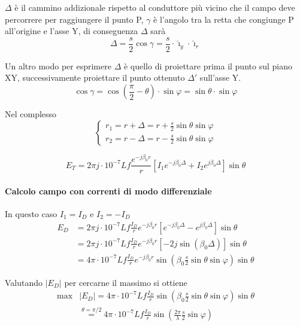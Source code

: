 
$\Delta$ è il cammino addizionale rispetto al conduttore più vicino
che il campo deve percorrere per raggiungere il punto P,
$\gamma$ è l'angolo tra la retta che congiunge P all'origine e l'asse Y, di conseguenza
$\Delta$ sarà 
$$
\Delta = \frac{s}{2}\cos\gamma = \frac{s}{2}\cdot \hat{\imath}_y\cdot \hat{\imath}_r
$$

Un altro modo per esprimere $\Delta$ è quello di proiettare prima il punto sul piano XY, successivamente
proiettare il punto ottenuto $\Delta'$ sull'asse Y.
$$
\cos\gamma = \cos\left(\frac{\pi}{2} - \theta\right) \cdot \sin\varphi = \sin\theta \cdot \sin\varphi
$$

Nel complesso
$$
\begin{cases}
r_1 = r + \Delta = r + \frac{s}{2} \sin\theta \sin\varphi \\
r_2 = r - \Delta = r - \frac{s}{2} \sin\theta \sin\varphi
\end{cases}
$$

$$
E_T = 2 \pi j \cdot 10^{-7} L f \frac{e^{-j \beta_0 r}}{r} \left[I_1 e^{-j \beta_0 \Delta} + I_2 e^{j \beta_0 \Delta} \right]\sin\theta
$$

\paragraph{Calcolo campo con correnti di modo differenziale}
In questo caso $I_1 = I_D$ e $I_2 = -I_D$
\begin{equation*}
 \begin{split}
E_D & = 2 \pi j \cdot 10^{-7} L f \frac{I_D}{r}e^{-j \beta_0 r} \left[e^{-j \beta_0 \Delta} - e^{j \beta_0 \Delta} \right]\sin\theta \\
 & = 2 \pi j \cdot 10^{-7} L f \frac{I_D}{r}e^{-j \beta_0 r} \left[-2j\sin(\beta_0\Delta)\right]\sin\theta \\ %
 & = 4\pi\cdot10^{-7}Lf\frac{I_D}{r}e^{-j\beta_0 r} \sin\left(\beta_0 \frac{s}{2} \sin\theta \sin\varphi \right)\sin\theta
  \end{split}
\end{equation*}

Valutando $\left|E_D\right|$ per cercarne il massimo si ottiene
\begin{equation*}
 \begin{split}
\text{max}&\left|E_D\right| = 4\pi\cdot10^{-7}Lf\frac{I_D}{r}\sin\left(\beta_0 \frac{s}{2} \sin\theta \sin\varphi \right)\sin\theta \\
& \stackrel{\theta = \pi/2}{=} 4\pi\cdot10^{-7}Lf\frac{I_D}{r}\sin\left(\frac{2\pi}{\lambda} \frac{s}{2} \sin\varphi \right) 
  \end{split}
\end{equation*}

